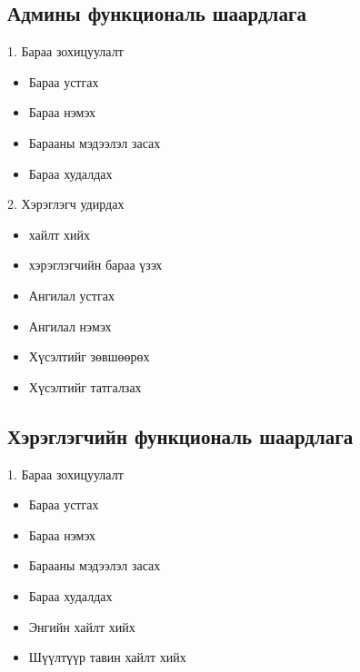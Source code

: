     \subsection{Админы функциональ шаардлага}
    1. Бараа зохицуулалт
    \begin{itemize}
    \item Бараа устгах
    \item Бараа нэмэх 
    \item Барааны мэдээлэл засах
    \item Бараа худалдах
\end{itemize}
      2. Хэрэглэгч удирдах
    \begin{itemize}
    \item хайлт хийх 
    \item хэрэглэгчийн бараа үзэх
    \end{itemize}
    \begin{itemize}
    \item Ангилал устгах
    \item Ангилал нэмэх 
\end{itemize}
   \begin{itemize}
    \item Хүсэлтийг зөвшөөрөх
    \item Хүсэлтийг татгалзах 
\end{itemize}
    \subsection{Хэрэглэгчийн функциональ шаардлага}
    1. Бараа зохицуулалт
    \begin{itemize}
    \item Бараа устгах
    \item Бараа нэмэх 
    \item Барааны мэдээлэл засах
    \item Бараа худалдах
\end{itemize}
     \begin{itemize}
    \item Энгийн хайлт хийх
    \item Шүүлтүүр тавин хайлт хийх
\end{itemize}
